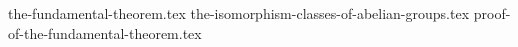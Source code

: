 \setcounter{chapter}{11}
\setcounter{section}{0}
{the-fundamental-theorem.tex}
{the-isomorphism-classes-of-abelian-groups.tex}
{proof-of-the-fundamental-theorem.tex}

